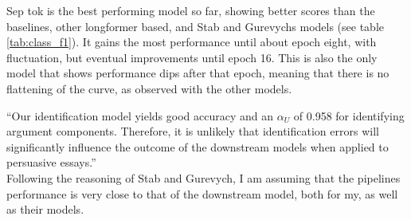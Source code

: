 \documentclass[12]{article}
\theoremstyle{mytheoremstyle}
\theoremstyle{mytheoremstyle}
\theoremstyle{myproblemstyle}
\begin{document}
  Sep tok is the best performing model so far, showing better scores than the baselines, other longformer based, and Stab and Gurevychs models (see table \ref{tab:class_f1}). 
  It gains the most performance until about epoch eight, with fluctuation, but eventual improvements until epoch 16. 
  This is also the only model that shows performance dips after that epoch, meaning that there is no flattening of the curve, as observed with the other models.

  ``Our identification model yields good accuracy and an $\alpha_U$ of 0.958 for identifying argument components. 
  Therefore, it is unlikely that identification errors will significantly influence the outcome of the downstream models when applied to persuasive essays.'' \cite{stab-gurevych-2017-parsing}\\
  Following the reasoning of Stab and Gurevych, I am assuming that the pipelines performance is very close to that of the downstream model, both for my, as well as their models.
\end{document}
